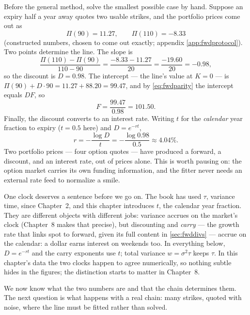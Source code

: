 Before the general method, solve the smallest possible case by
hand.  Suppose an expiry half a year away quotes two usable strikes,
and the portfolio prices come out as
\[
\Pi(90)=11.27,\qquad \Pi(110)=-8.33
\]
(constructed numbers, chosen to come out exactly; appendix
\ref{app:fwdprotocol}).  Two points determine the line.  The slope is
\[
\frac{\Pi(110)-\Pi(90)}{110-90}
=\frac{-8.33-11.27}{20}
=\frac{-19.60}{20}
=-0.98 ,
\]
so the discount is $D=0.98$.  The intercept --- the line's value at
$K=0$ --- is $\Pi(90)+D\cdot90=11.27+88.20=99.47$, and by
\eqref{eq:fwdparity} the intercept equals $DF$, so
\[
F=\frac{99.47}{0.98}=101.50 .
\]
Finally, the discount converts to an interest rate.  Writing $t$ for
the \emph{calendar} year fraction to expiry ($t=0.5$ here) and
$D=e^{-rt}$,
\[
r=-\frac{\log D}{t}=-\frac{\log 0.98}{0.5}\approx 4.04\% .
\]
Two portfolio prices --- four option quotes --- have produced a
forward, a discount, and an interest rate, out of prices alone.  This is worth pausing on: the option
market carries its own funding information, and the fitter never needs
an external rate feed to normalize a smile.

One clock deserves a sentence before we go on.  The book has used
$\tau$, variance time, since Chapter~2, and this chapter introduces
$t$, the calendar year fraction.  They are different objects with
different jobs: variance accrues on the market's clock (Chapter~8
makes that precise), but discounting and \emph{carry} --- the growth
rate that links spot to forward, given its full content in
\cref{sec:fwddivs} --- accrue on the calendar: a dollar earns
interest on weekends too.  In everything below, $D=e^{-rt}$ and the
carry exponents use $t$; total variance $w=\sigma^2\tau$ keeps
$\tau$.  In this chapter's data the two clocks
happen to agree numerically, so nothing subtle hides in the figures;
the distinction starts to matter in Chapter~8.

We now know what the two numbers are and that the chain determines
them.  The next question is what happens with a real chain: many
strikes, quoted with noise, where the line must be fitted rather than
solved.
